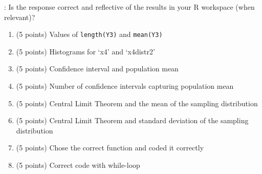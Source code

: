 \documentclass{article}
\begin{document}
: Is the response correct and reflective of the results in your R workspace (when relevant)?

\begin{enumerate}
\item (5 points) Values of \texttt{length(Y3)} and \texttt{mean(Y3)}
\item (5 points) Histograms for `x4' and `x4distr2'
\item (5 points) Confidence interval and population mean
\item (5 points) Number of confidence intervals capturing population mean
\item (5 points) Central Limit Theorem and the mean of the sampling distribution
\item (5 points) Central Limit Theorem and standard deviation of the sampling distribution
\item (5 points) Chose the correct function and coded it correctly
\item (5 points) Correct code with while-loop
\end{enumerate}
\end{document}

